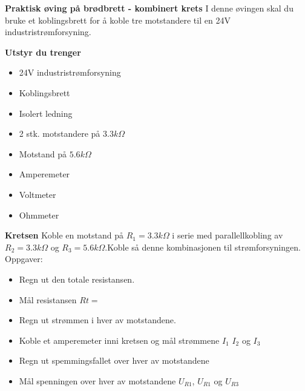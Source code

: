 

\large \textbf{Praktisk øving på brødbrett - kombinert krets }
\normalsize 
\vskip 10pt 
I denne øvingen skal du bruke et koblingsbrett for å koble tre motstandere til en 24V industristrømforsyning.

\vskip 10pt 
\large \textbf{Utstyr du trenger}

\vskip 10pt 
\begin{itemize}[noitemsep]

\item 24V industristrømforsyning
\item Koblingsbrett
\item Isolert ledning
\item 2 stk. motstandere på $3.3k\Omega$
\item Motstand på $5.6k\Omega$
\item Amperemeter
\item Voltmeter
\item Ohmmeter
\end{itemize}


\large \textbf{Kretsen}
\normalsize
\vskip 10pt 
Koble en motstand på $R_{1}=3.3k\Omega$ i serie med parallellkobling av $R_{2}=3.3k\Omega$ og $R_{3}=5.6k\Omega$.Koble så denne kombinasjonen til strømforsyningen. 
Oppgaver:
\begin{itemize}[noitemsep]
	\item Regn ut den totale resistansen.
	\item Mål resistansen $R{t}=$
	\item Regn ut strømmen i hver av motstandene.
	\item Koble et amperemeter inni kretsen og mål strømmene $I_1$ $I_2$ og $I_3$
	\item Regn ut spemmingsfallet over hver av motstandene
	\item Mål spenningen over hver av motstandene $U_{R1}$, $U_{R1}$ og $U_{R3}$
\end{itemize}




















